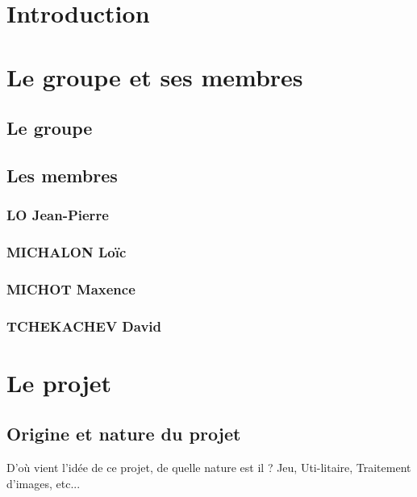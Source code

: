\documentclass{article}
\title{
\textbf{\begin{center}\Huge Cahier des charges \end{center}}
\textrm{ \underline{Groupe} : Sépanou}}
\author{LO Jean-Pierre | MICHALON Loïc\and MICHOT Maxence | TCHEKACHEV David}
\date{Janvier 2021}
\begin{document}
\maketitle

\pagebreak

\renewcommand*\contentsname{\textbf{\Huge Sommaire \newline}}
\large \tableofcontents

\pagebreak

\section{Introduction}
\lipsum[7-9]

\pagebreak

\section{Le groupe et ses membres}
\subsection{Le groupe}
\lipsum[4-5]

\subsection{Les membres}
\subsubsection{LO Jean-Pierre}
\lipsum[3]
\subsubsection{MICHALON Loïc}
\lipsum[3]
\subsubsection{MICHOT Maxence}
\lipsum[3]
\subsubsection{TCHEKACHEV David}
\lipsum[2]
\pagebreak

\section{Le projet}
\subsection{Origine et nature du projet}
D’où vient l’idée de ce projet, de quelle nature est il ? Jeu, Uti-litaire, Traitement d’images, etc...
\end{document}
